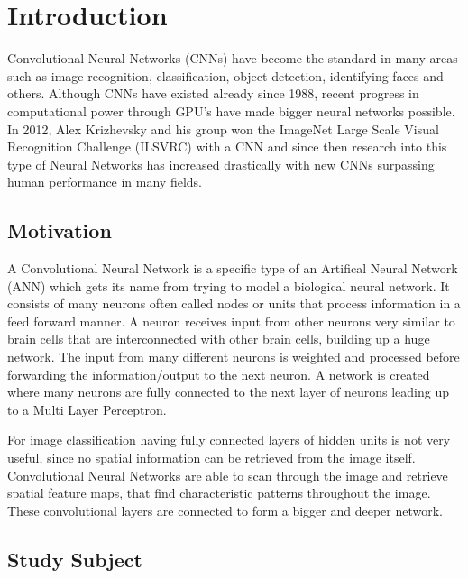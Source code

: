 \chapter{Introduction}

Convolutional Neural Networks (CNNs) have become the standard in many areas such as image recognition, classification, object detection, identifying faces and others. Although CNNs have existed already since 1988, recent progress in computational power through GPU's have made bigger neural networks possible. In 2012, Alex Krizhevsky and his group won the ImageNet Large Scale Visual Recognition Challenge (ILSVRC) with a CNN and since then research into this type of Neural Networks has increased drastically with new CNNs surpassing human performance in many fields.

\section{Motivation}

A Convolutional Neural Network is a specific type of an Artifical Neural Network (ANN) which gets its name from trying to model a biological neural network. It consists of many neurons often called nodes or units that process information in a feed forward manner. A neuron receives input from other neurons very similar to brain cells that are interconnected with other brain cells, building up a huge network. The input from many different neurons is weighted and processed before forwarding the information/output to the next neuron. A network is created where many neurons are fully connected to the next layer of neurons leading up to a Multi Layer Perceptron.

For image classification having fully connected layers of hidden units is not very useful, since no spatial information can be retrieved from the image itself. Convolutional Neural Networks are able to scan through the image and retrieve spatial feature maps, that find characteristic patterns throughout the image. These convolutional layers are connected to form a bigger and deeper network. 

\section{Study Subject}

